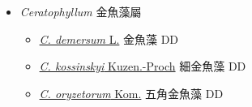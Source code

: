 
  \begin{itemize}
 \item[] \textit{Ceratophyllum} 金魚藻屬
                                
  \begin{itemize}
        \item[] \href{http://www.theplantlist.org/tpl1.1/search?q=Ceratophyllum+demersum}{\textit{C. demersum} L.}   金魚藻   DD
        \item[] \href{http://www.theplantlist.org/tpl1.1/search?q=Ceratophyllum+kossinskyi}{\textit{C. kossinskyi} Kuzen.-Proch}   細金魚藻   DD
        \item[] \href{http://www.theplantlist.org/tpl1.1/search?q=Ceratophyllum+oryzetorum}{\textit{C. oryzetorum} Kom.}   五角金魚藻   DD
  \end{itemize}
  \end{itemize}

